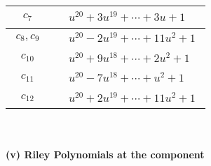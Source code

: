 \documentclass[1p]{elsarticle_modified}
\theoremstyle{definition}
\begin{document}
\begin{tabular}{m{50pt}|m{274pt}}
\hline $$\begin{aligned}c_{7}\end{aligned}$$&$\begin{aligned}
&u^{20}+3 u^{19}+\cdots+3 u+1
\end{aligned}$\\
\hline $$\begin{aligned}c_{8},c_{9}\end{aligned}$$&$\begin{aligned}
&u^{20}-2 u^{19}+\cdots+11 u^2+1
\end{aligned}$\\
\hline $$\begin{aligned}c_{10}\end{aligned}$$&$\begin{aligned}
&u^{20}+9 u^{18}+\cdots+2 u^2+1
\end{aligned}$\\
\hline $$\begin{aligned}c_{11}\end{aligned}$$&$\begin{aligned}
&u^{20}-7 u^{18}+\cdots+u^2+1
\end{aligned}$\\
\hline $$\begin{aligned}c_{12}\end{aligned}$$&$\begin{aligned}
&u^{20}+2 u^{19}+\cdots+11 u^2+1
\end{aligned}$\\
\hline
\end{tabular}\\~\\
\newpage\renewcommand{\arraystretch}{1}
\flushleft \textbf{(v) Riley Polynomials at the component}\newline \\
\end{document}
